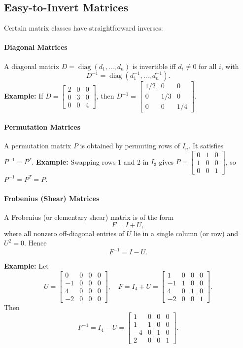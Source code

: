 \documentclass{article}
\begin{document}
\begin{multicols}{2}
\subsection*{Easy-to-Invert Matrices}
Certain matrix classes have straightforward inverses:

\paragraph{Diagonal Matrices}
A diagonal matrix $D=\operatorname{diag}(d_1,\dots,d_n)$ is invertible iff $d_i\neq0$ for all $i$, with
\[
D^{-1} = \operatorname{diag}(d_1^{-1},\dots,d_n^{-1}).
\]
\textbf{Example:} If
$D=\begin{bmatrix}2 & 0 & 0\\0 & 3 & 0\\0 & 0 & 4\end{bmatrix}$,
then
$D^{-1}=\begin{bmatrix}1/2 & 0 & 0\\0 & 1/3 & 0\\0 & 0 & 1/4\end{bmatrix}$.

\paragraph{Permutation Matrices}
A permutation matrix $P$ is obtained by permuting rows of $I_n$. It satisfies $P^{-1}=P^T$.
\textbf{Example:} Swapping rows 1 and 2 in $I_3$ gives
$P=\begin{bmatrix}0 & 1 & 0\\1 & 0 & 0\\0 & 0 & 1\end{bmatrix}$,
so $P^{-1}=P^T=P$.

\paragraph{Frobenius (Shear) Matrices}
A Frobenius (or elementary shear) matrix is of the form
\[
F = I + U,
\]
where all nonzero off-diagonal entries of $U$ lie in a single column (or row) and $U^2=0$. Hence
\[
F^{-1} = I - U.
\]

\textbf{Example:} Let
\[
U = \begin{bmatrix}
0 & 0 & 0 & 0\\
-1 & 0 & 0 & 0\\
4 & 0 & 0 & 0\\
-2 & 0 & 0 & 0
\end{bmatrix},
\quad
F = I_4 + U = \begin{bmatrix}
1 & 0 & 0 & 0\\
-1 & 1 & 0 & 0\\
4 & 0 & 1 & 0\\
-2 & 0 & 0 & 1
\end{bmatrix}.
\]
Then
\[
F^{-1} = I_4 - U = \begin{bmatrix}
1 & 0 & 0 & 0\\
1 & 1 & 0 & 0\\
-4 & 0 & 1 & 0\\
2 & 0 & 0 & 1
\end{bmatrix}.
\]


\end{multicols}
\end{document}
